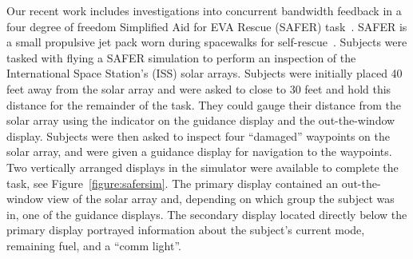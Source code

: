 \documentclass[float=false, crop=false]{standalone}
\begin{document}
Our recent work includes investigations into concurrent bandwidth feedback in a four degree of freedom Simplified Aid for EVA Rescue (SAFER) task~\cite{Karasinski2016Masters, Karasinski2017, Karasinski2016}.
SAFER is a small propulsive jet pack worn during spacewalks for self-rescue~\cite{Vassigh1998}.
Subjects were tasked with flying a SAFER simulation to perform an inspection of the International Space Station's (ISS) solar arrays.
Subjects were initially placed 40 feet away from the solar array and were asked to close to 30 feet and hold this distance for the remainder of the task.
They could gauge their distance from the solar array using the indicator on the guidance display and the out-the-window display.
Subjects were then asked to inspect four ``damaged'' waypoints on the solar array, and were given a guidance display for navigation to the waypoints. %
Two vertically arranged displays in the simulator were available to complete the task, see Figure~\ref{figure:safersim}.
The primary display contained an out-the-window view of the solar array and, depending on which group the subject was in, one of the guidance displays. %
The secondary display located directly below the primary display portrayed information about the subject's current mode, remaining fuel, and a ``comm light''.
\end{document}
